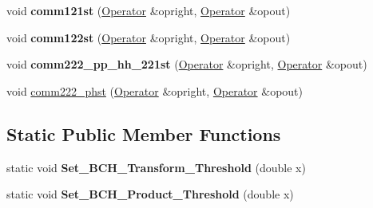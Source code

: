 \begin{DoxyCompactItemize}
\item 
\hypertarget{classOperator_ad6cf6f66211d0893ef0784cde14445f0}{void {\bfseries comm121st} (\hyperlink{classOperator}{Operator} \&opright, \hyperlink{classOperator}{Operator} \&opout)}\label{classOperator_ad6cf6f66211d0893ef0784cde14445f0}

\item 
\hypertarget{classOperator_ac7b9d8a707c3cfc953f070967704835e}{void {\bfseries comm122st} (\hyperlink{classOperator}{Operator} \&opright, \hyperlink{classOperator}{Operator} \&opout)}\label{classOperator_ac7b9d8a707c3cfc953f070967704835e}

\item 
\hypertarget{classOperator_a850ad8c78ae948a6243e6041eaee5b64}{void {\bfseries comm222\-\_\-pp\-\_\-hh\-\_\-221st} (\hyperlink{classOperator}{Operator} \&opright, \hyperlink{classOperator}{Operator} \&opout)}\label{classOperator_a850ad8c78ae948a6243e6041eaee5b64}

\item 
void \hyperlink{classOperator_a0f3ee31f13fff9cb88e0e107e2acdf8a}{comm222\-\_\-phst} (\hyperlink{classOperator}{Operator} \&opright, \hyperlink{classOperator}{Operator} \&opout)
\end{DoxyCompactItemize}
\subsection*{Static Public Member Functions}
\begin{DoxyCompactItemize}
\item 
\hypertarget{classOperator_a6f505221635444cb0b489b9ac600fd61}{static void {\bfseries Set\-\_\-\-B\-C\-H\-\_\-\-Transform\-\_\-\-Threshold} (double x)}\label{classOperator_a6f505221635444cb0b489b9ac600fd61}

\item 
\hypertarget{classOperator_a2c42843a1a557f2ab568d106e8fd23e8}{static void {\bfseries Set\-\_\-\-B\-C\-H\-\_\-\-Product\-\_\-\-Threshold} (double x)}\label{classOperator_a2c42843a1a557f2ab568d106e8fd23e8}

\end{DoxyCompactItemize}
